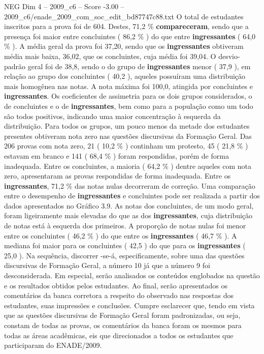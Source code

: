\begin{textsample}{NEG Dim 4 – 2009\_c6 – Score -3.00 – 2009\_c6/enade\_2009\_com\_soc\_edit\_bd87747c88.txt}
O total de estudantes inscritos para a prova foi de 604.
Destes, 71,2 \% \textbf{compareceram}, sendo que a presença foi maior entre concluintes ( 86,2 \% ) do que entre \textbf{ingressantes} ( 64,0 \% ).
A média geral da prova foi 37,20, sendo que os \textbf{ingressantes} obtiveram média mais baixa, 36,02, que os concluintes, cuja média foi 39,04.
O desvio-padrão geral foi de 38,8, sendo o do grupo de \textbf{ingressantes} menor ( 37,9 ), em relação ao grupo dos concluintes ( 40,2 ), aqueles possuíram uma distribuição mais homogênea nas notas.
A nota máxima foi 100,0, atingida por concluintes e \textbf{ingressantes}.
Os coeficientes de assimetria para os dois grupos considerados, o de concluintes e o de \textbf{ingressantes}, bem como para a população como um todo são todos positivos, indicando uma maior concentração à esquerda da distribuição.
Para todos os grupos, um pouco menos da metade dos estudantes presentes obtiveram nota zero nas questões discursivas da Formação Geral.
Das 206 provas com nota zero, 21 ( 10,2 \% ) continham um protesto, 45 ( 21,8 \% ) estavam em branco e 141 ( 68,4 \% ) foram respondidas, porém de forma inadequada.
Entre os concluintes, a maioria ( 64,2 \% ) dentre aqueles com nota zero, apresentaram as provas respondidas de forma inadequada.
Entre os \textbf{ingressantes}, 71,2 \% das notas nulas decorreram de correção.
Uma comparação entre o desempenho de \textbf{ingressantes} e concluintes pode ser realizada a partir dos dados apresentados no Gráfico 3.9.
As notas dos concluintes, de um modo geral, foram ligeiramente mais elevadas do que as dos \textbf{ingressantes}, cuja distribuição de notas está à esquerda dos primeiros.
A proporção de notas nulas foi menor entre os concluintes ( 46,2 \% ) do que entre os \textbf{ingressantes} ( 46,7 \% ).
A mediana foi maior para os concluintes ( 42,5 ) do que para os \textbf{ingressantes} ( 25,0 ).
Na sequência, discorrer -se-á, especificamente, sobre uma das questões discursivas de Formação Geral, a número 10 já que a número 9 foi desconsiderada.
Em especial, serão analisados os conteúdos englobados na questão e os resultados obtidos pelos estudantes.
Ao final, serão apresentados os comentários da banca corretora a respeito do observado nas respostas dos estudantes, suas impressões e conclusões.
Cumpre esclarecer que, tendo em vista que as questões discursivas de Formação Geral foram padronizadas, ou seja, constam de todas as provas, os comentários da banca foram os mesmos para todas as áreas acadêmicas, eis que direcionados a todos os estudantes que participaram do ENADE/2009.

\end{textsample}
